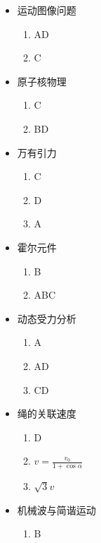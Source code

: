 \documentclass{article}
\begin{document}
\begin{minipage}{0.5\textwidth}
    \begin{itemize}
        \item 运动图像问题
              \begin{enumerate}
                  \item AD
                  \item C
              \end{enumerate}
        \item 原子核物理
              \begin{enumerate}
                  \item C
                  \item BD
              \end{enumerate}
        \item 万有引力
              \begin{enumerate}
                  \item C
                  \item D
                  \item A
              \end{enumerate}
        \item 霍尔元件
              \begin{enumerate}
                  \item B
                  \item ABC
              \end{enumerate}
        \item 动态受力分析
              \begin{enumerate}
                  \item A
                  \item AD
                  \item CD
              \end{enumerate}
        \item 绳的关联速度
              \begin{enumerate}
                  \item D
                  \item $v = \frac{v_{0}}{1+\cos{\alpha}}$
                  \item $\sqrt{3}v$
              \end{enumerate}
        \item 机械波与简谐运动
              \begin{enumerate}
                  \item B

\end{enumerate}
\end{itemize}
\end{minipage}
\end{document}

